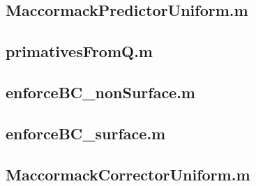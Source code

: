 \documentclass[10pt,a4paper]{article}
\begin{document}
\subsection*{MaccormackPredictorUniform.m}


\subsection*{primativesFromQ.m}


\subsection*{enforceBC\_nonSurface.m}


\subsection*{enforceBC\_surface.m}


\subsection*{MaccormackCorrectorUniform.m}

\end{document}
